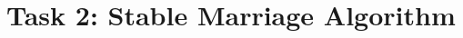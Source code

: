 \documentclass{scrartcl}
\begin{document}
	\section*{Task 2: Stable Marriage Algorithm}
	\begin{center}
		\hspace*{-0.3cm}
	\end{center}
\end{document}
